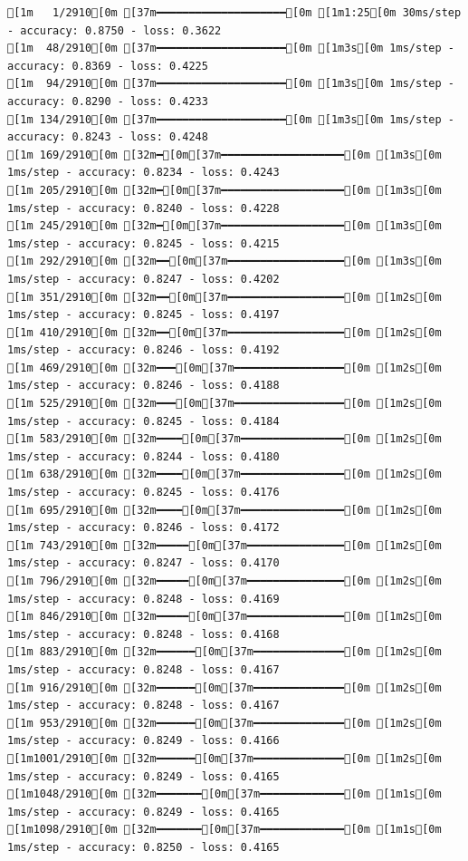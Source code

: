 \documentclass[
  letterpaper,
  DIV=11,
  numbers=noendperiod]{scrartcl}
\begin{document}
\begin{verbatim}
[1m   1/2910[0m [37m━━━━━━━━━━━━━━━━━━━━[0m [1m1:25[0m 30ms/step - accuracy: 0.8750 - loss: 0.3622
[1m  48/2910[0m [37m━━━━━━━━━━━━━━━━━━━━[0m [1m3s[0m 1ms/step - accuracy: 0.8369 - loss: 0.4225   
[1m  94/2910[0m [37m━━━━━━━━━━━━━━━━━━━━[0m [1m3s[0m 1ms/step - accuracy: 0.8290 - loss: 0.4233
[1m 134/2910[0m [37m━━━━━━━━━━━━━━━━━━━━[0m [1m3s[0m 1ms/step - accuracy: 0.8243 - loss: 0.4248
[1m 169/2910[0m [32m━[0m[37m━━━━━━━━━━━━━━━━━━━[0m [1m3s[0m 1ms/step - accuracy: 0.8234 - loss: 0.4243
[1m 205/2910[0m [32m━[0m[37m━━━━━━━━━━━━━━━━━━━[0m [1m3s[0m 1ms/step - accuracy: 0.8240 - loss: 0.4228
[1m 245/2910[0m [32m━[0m[37m━━━━━━━━━━━━━━━━━━━[0m [1m3s[0m 1ms/step - accuracy: 0.8245 - loss: 0.4215
[1m 292/2910[0m [32m━━[0m[37m━━━━━━━━━━━━━━━━━━[0m [1m3s[0m 1ms/step - accuracy: 0.8247 - loss: 0.4202
[1m 351/2910[0m [32m━━[0m[37m━━━━━━━━━━━━━━━━━━[0m [1m2s[0m 1ms/step - accuracy: 0.8245 - loss: 0.4197
[1m 410/2910[0m [32m━━[0m[37m━━━━━━━━━━━━━━━━━━[0m [1m2s[0m 1ms/step - accuracy: 0.8246 - loss: 0.4192
[1m 469/2910[0m [32m━━━[0m[37m━━━━━━━━━━━━━━━━━[0m [1m2s[0m 1ms/step - accuracy: 0.8246 - loss: 0.4188
[1m 525/2910[0m [32m━━━[0m[37m━━━━━━━━━━━━━━━━━[0m [1m2s[0m 1ms/step - accuracy: 0.8245 - loss: 0.4184
[1m 583/2910[0m [32m━━━━[0m[37m━━━━━━━━━━━━━━━━[0m [1m2s[0m 1ms/step - accuracy: 0.8244 - loss: 0.4180
[1m 638/2910[0m [32m━━━━[0m[37m━━━━━━━━━━━━━━━━[0m [1m2s[0m 1ms/step - accuracy: 0.8245 - loss: 0.4176
[1m 695/2910[0m [32m━━━━[0m[37m━━━━━━━━━━━━━━━━[0m [1m2s[0m 1ms/step - accuracy: 0.8246 - loss: 0.4172
[1m 743/2910[0m [32m━━━━━[0m[37m━━━━━━━━━━━━━━━[0m [1m2s[0m 1ms/step - accuracy: 0.8247 - loss: 0.4170
[1m 796/2910[0m [32m━━━━━[0m[37m━━━━━━━━━━━━━━━[0m [1m2s[0m 1ms/step - accuracy: 0.8248 - loss: 0.4169
[1m 846/2910[0m [32m━━━━━[0m[37m━━━━━━━━━━━━━━━[0m [1m2s[0m 1ms/step - accuracy: 0.8248 - loss: 0.4168
[1m 883/2910[0m [32m━━━━━━[0m[37m━━━━━━━━━━━━━━[0m [1m2s[0m 1ms/step - accuracy: 0.8248 - loss: 0.4167
[1m 916/2910[0m [32m━━━━━━[0m[37m━━━━━━━━━━━━━━[0m [1m2s[0m 1ms/step - accuracy: 0.8248 - loss: 0.4167
[1m 953/2910[0m [32m━━━━━━[0m[37m━━━━━━━━━━━━━━[0m [1m2s[0m 1ms/step - accuracy: 0.8249 - loss: 0.4166
[1m1001/2910[0m [32m━━━━━━[0m[37m━━━━━━━━━━━━━━[0m [1m2s[0m 1ms/step - accuracy: 0.8249 - loss: 0.4165
[1m1048/2910[0m [32m━━━━━━━[0m[37m━━━━━━━━━━━━━[0m [1m1s[0m 1ms/step - accuracy: 0.8249 - loss: 0.4165
[1m1098/2910[0m [32m━━━━━━━[0m[37m━━━━━━━━━━━━━[0m [1m1s[0m 1ms/step - accuracy: 0.8250 - loss: 0.4165

\end{verbatim}
\end{document}
